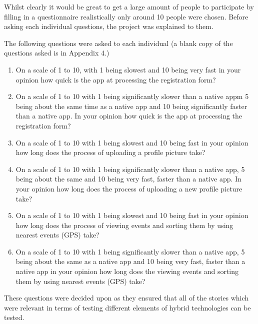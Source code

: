 Whilst clearly it would be great to get a large amount of people to participate by filling in a questionnaire realistically only around 10 people were chosen. Before asking each individual questions, the project was explained to them.

The following questions were asked to each individual (a blank copy of the questions asked is in  Appendix 4.)

\begin{enumerate}
\item On a scale of 1 to 10, with 1 being slowest and 10 being very fast in your opinion how quick is the app at processing the registration form?
\item On a scale of 1 to 10 with 1 being significantly slower than a native appm 5 being about the same time as a native app and 10 being significantly faster than a native app. In your opinion how quick is the app at processing the registration form?
\item On a scale of 1 to 10 with 1 being slowest and 10 being fast in your opinion how long does the process of uploading a profile picture take?
\item On a scale of 1 to 10 with 1 being significantly slower than a native app, 5 being about the same and 10 being very fast, faster than a native app. In your opinion how long does the process of uploading a new profile picture take?
\item On a scale of 1 to 10 with 1 being slowest and 10 being fast in your opinion how long does the process of viewing events and sorting them by using nearest events (GPS) take?
\item On a scale of 1 to 10 with 1 being significantly slower than a native app, 5 being about the same as a native app and 10 being very fast, faster than a native app in your opinion how long does the viewing events and sorting them by using nearest events (GPS) take?
\end{enumerate}
These questions were decided upon as they ensured that all of the stories which were relevant in terms of testing different elements of hybrid technologies can be tested.
